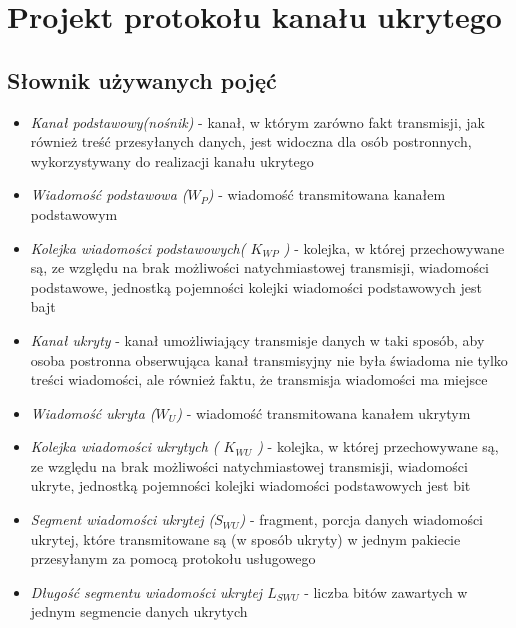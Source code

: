 \documentclass[a4paper, twoside, 12pt]{report}
\begin{document}
\chapter{Projekt protokołu kanału ukrytego}
    \section{Słownik używanych pojęć} \label{DICT}
    \begin{itemize}
        \item \emph{Kanał podstawowy(nośnik)} - kanał, w którym zarówno fakt transmisji,
            jak również treść przesyłanych danych, jest widoczna dla osób postronnych,
            wykorzystywany do realizacji kanału ukrytego

        \item \emph{Wiadomość podstawowa (\(W_P\))} - wiadomość transmitowana kanałem
            podstawowym

        \item \emph{Kolejka wiadomości podstawowych( \( K_{WP} \) )} - kolejka, w
                której przechowywane są, ze względu na brak możliwości natychmiastowej
                transmisji, wiadomości podstawowe, jednostką pojemności kolejki
                wiadomości podstawowych jest bajt

        \item \emph{Kanał ukryty} - kanał umożliwiający transmisje danych w taki sposób,
            aby osoba postronna obserwująca kanał transmisyjny nie była świadoma
            nie tylko treści wiadomości, ale również faktu, że transmisja wiadomości ma miejsce

        \item \emph{Wiadomość ukryta (\(W_U\))} - wiadomość transmitowana kanałem ukrytym

        \item \emph{Kolejka wiadomości ukrytych ( \( K_{WU} \) )} - kolejka, w
                której przechowywane są, ze względu na brak możliwości natychmiastowej
                transmisji, wiadomości ukryte, jednostką pojemności kolejki
                wiadomości podstawowych jest bit

        \item \emph{Segment wiadomości ukrytej (\(S_{WU}\))} - fragment, porcja danych
            wiadomości ukrytej, które transmitowane są (w sposób ukryty) w jednym
            pakiecie przesyłanym za pomocą protokołu usługowego

        \item \emph{Długość segmentu wiadomości ukrytej \( L_{SWU} \)} - liczba
                bitów zawartych w jednym segmencie danych ukrytych


\end{itemize}
\end{document}

